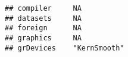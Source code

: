 \documentclass[]{article}
\begin{document}
\begin{verbatim}
## compiler     NA                                                                                                                                                                                                                                                                                                                                                                                                                                                                                                                                                                                        
## datasets     NA                                                                                                                                                                                                                                                                                                                                                                                                                                                                                                                                                                                        
## foreign      NA                                                                                                                                                                                                                                                                                                                                                                                                                                                                                                                                                                                        
## graphics     NA                                                                                                                                                                                                                                                                                                                                                                                                                                                                                                                                                                                        
## grDevices    "KernSmooth"                                                                                                                                                                                                                                                                                                                                                                                                                                                                                                                                                                              

\end{verbatim}
\end{document}

